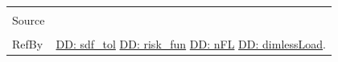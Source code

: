 \documentclass[12pt]{article}
\begin{document}
\begin{minipage}{\textwidth}
\begin{tabular}{p{} p{}}
                                                          \\ \midrule \\
                                                          Source & \cite{astm2009}
                                                                   \\ \midrule \\
                                                                   RefBy & \hyperref[DD:sdf.tol]{DD: sdf\_tol} \hyperref[DD:risk.fun]{DD: risk\_fun} \hyperref[DD:nFL]{DD: nFL} \hyperref[DD:dimlessLoad]{DD: dimlessLoad}.
\\ \bottomrule \end{tabular}
\end{minipage}
\par~
\end{document}
